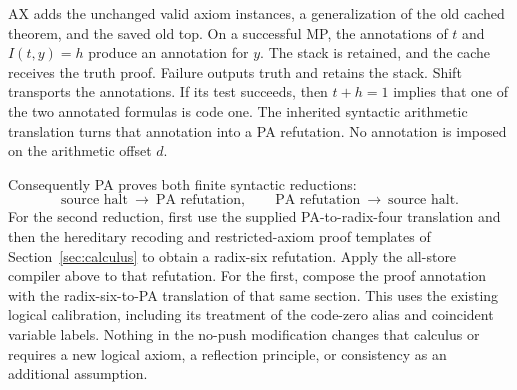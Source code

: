 AX adds the unchanged valid axiom instances, a generalization of the old
cached theorem, and the saved old top. On a successful MP, the annotations
of $t$ and $I(t,y)=h$ produce an annotation for $y$. The stack is retained,
and the cache receives the truth proof. Failure outputs truth and retains
the stack. Shift transports the annotations. If its test succeeds, then
$t+h=1$ implies that one of the two annotated formulas is code one.
The inherited syntactic arithmetic translation turns that annotation into
a PA refutation. No annotation is imposed on the arithmetic offset $d$.

Consequently PA proves both finite syntactic reductions:
\[
 \text{source halt}\ \longrightarrow\ \text{PA refutation},
 \qquad
 \text{PA refutation}\ \longrightarrow\ \text{source halt}.
\]
For the second reduction, first use the supplied PA-to-radix-four
translation and then the hereditary recoding and restricted-axiom proof
templates of Section~\ref{sec:calculus} to obtain a radix-six
refutation. Apply the all-store compiler above to that refutation.
For the first, compose the proof annotation with the radix-six-to-PA
translation of that same section. This uses the existing logical calibration,
including its treatment of the code-zero alias and coincident variable
labels. Nothing in the no-push modification changes that calculus or
requires a new logical axiom, a reflection principle, or consistency as
an additional assumption.

